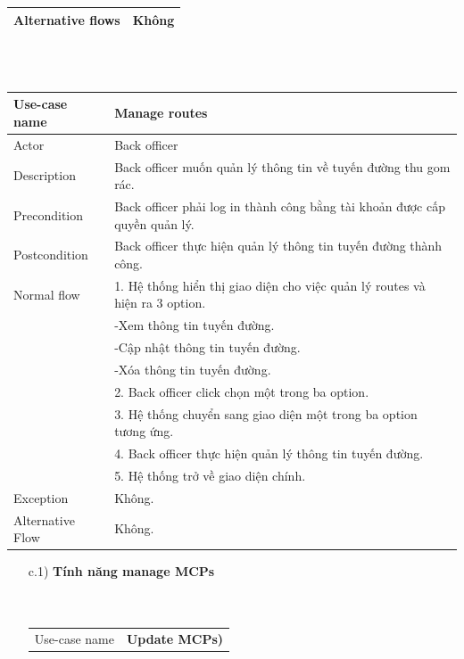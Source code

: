 \documentclass[a4paper]{article}
\begin{document}
\begin{enumerate}
\begin{tabular}{| p{3cm} | p{10cm} |}
     Alternative flows & Không
     \\ \hline
\end{tabular}
\\
\vspace{0.5cm}  \\
\begin{tabular}{|p{3cm} | p{10cm}|}
\hline
     Use-case name & \textbf{Manage routes}  \\
     \hline
     Actor & Back officer \\
     \hline
     Description & Back officer muốn quản lý thông tin về tuyến đường thu gom rác. \\
     \hline
     Precondition & Back officer phải log in thành công bằng tài khoản được cấp quyền quản lý. \\
    \hline  Postcondition & Back officer thực hiện quản lý thông tin tuyến đường thành công. \\
     \hline 
     Normal flow & 
     1. Hệ thống hiển thị giao diện cho việc quản lý routes và hiện ra 3 option. \\
        &\hspace{1cm} -Xem thông tin tuyến đường. \\
        &\hspace{1cm} -Cập nhật thông tin tuyến đường. \\
        &\hspace{1cm} -Xóa thông tin tuyến đường. \\
     &2. Back officer click chọn một trong ba option. \\
     &3. Hệ thống chuyển sang giao diện một trong ba option tương ứng. \\
     &4. Back officer thực hiện quản lý thông tin tuyến đường. \\
     &5. Hệ thống trở về giao diện chính. \\
    \hline
    Exception & Không. \\
    \hline
    Alternative Flow & Không. \\
\hline
\end{tabular} 
\vspace{0.5cm}
\begin{enumerate}
    \item[c.1)] \textbf{Tính năng manage MCPs} 
    \\ \\ \\
    \begin{tabular}{|p{3cm} | p{10cm}|}
    \hline
         Use-case name & \textbf{Update MCPs)}  \\

\end{tabular}
\end{enumerate}
\end{enumerate}
\end{document}
